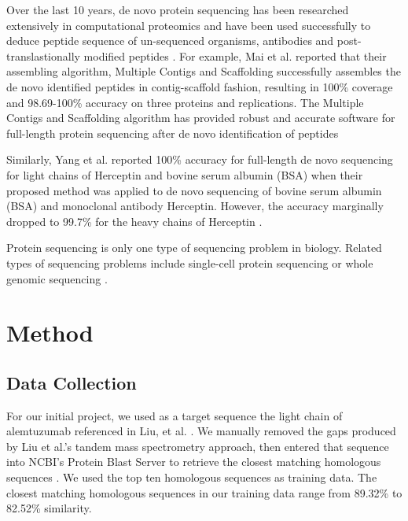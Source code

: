\documentclass[journal]{IEEEtran}
\begin{document}
    Over the last 10 years, de novo protein sequencing has been researched
    extensively in computational proteomics and have been used successfully to deduce peptide sequence
    of un-sequenced organisms, antibodies and post-translastionally modified peptides
    \cite{ma2012novo,veltman2012novo, bandeira2007spectral}. For example,
    Mai et al. reported that their assembling algorithm, Multiple Contigs and Scaffolding
    successfully assembles the de novo identified peptides in contig-scaffold fashion, resulting in
    100\% coverage and 98.69-100\% accuracy on three proteins and replications. The Multiple Contigs
    and Scaffolding algorithm has provided robust and accurate software for full-length protein sequencing
    after de novo identification of peptides \cite{mai2022highly}

    Similarly, Yang et al. reported 100\% accuracy for full-length de novo sequencing
    for light chains of Herceptin and bovine serum albumin (BSA) when their proposed method was applied to de novo
    sequencing of bovine serum albumin (BSA) and monoclonal antibody Herceptin. However, the accuracy marginally dropped to
    99.7\% for the heavy chains of Herceptin \cite{yang2021full}.

    Protein sequencing is only one type of sequencing problem in biology. Related types of sequencing problems include
    single-cell protein sequencing or whole genomic sequencing \cite{wang2015advances,pareek2011sequencing}.

\section{Method}

  \subsection{Data Collection}
    For our initial project, we used as a target sequence the light chain of alemtuzumab referenced in Liu, et al.
    \cite{liu2014novo}. We manually removed the gaps produced by Liu et al.'s tandem mass spectrometry approach, then
    entered that sequence into NCBI's Protein Blast Server to retrieve the closest matching homologous sequences \cite{ncbi}.
    We used the top ten homologous sequences as training data. The closest matching homologous sequences in our training
    data range from 89.32\% to 82.52\% similarity.
\end{document}
